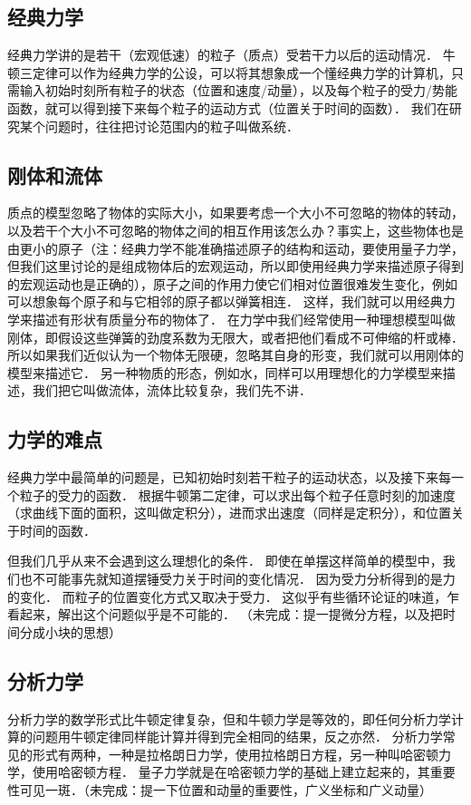 
\subsection{经典力学}
经典力学讲的是若干（宏观低速）的粒子（质点）受若干力以后的运动情况． 牛顿三定律可以作为经典力学的公设，可以将其想象成一个懂经典力学的计算机，只需输入初始时刻所有粒子的状态（位置和速度/动量），以及每个粒子的受力/势能函数，就可以得到接下来每个粒子的运动方式（位置关于时间的函数）． 我们在研究某个问题时，往往把讨论范围内的粒子叫做系统．

\subsection{刚体和流体}
质点的模型忽略了物体的实际大小，如果要考虑一个大小不可忽略的物体的转动，以及若干个大小不可忽略的物体之间的相互作用该怎么办？事实上，这些物体也是由更小的原子（注：经典力学不能准确描述原子的结构和运动，要使用量子力学，但我们这里讨论的是组成物体后的宏观运动，所以即使用经典力学来描述原子得到的宏观运动也是正确的），原子之间的作用力使它们相对位置很难发生变化，例如可以想象每个原子和与它相邻的原子都以弹簧相连． 这样，我们就可以用经典力学来描述有形状有质量分布的物体了． 在力学中我们经常使用一种理想模型叫做刚体，即假设这些弹簧的劲度系数为无限大，或者把他们看成不可伸缩的杆或棒． 所以如果我们近似认为一个物体无限硬，忽略其自身的形变，我们就可以用刚体的模型来描述它． 另一种物质的形态，例如水，同样可以用理想化的力学模型来描述，我们把它叫做流体，流体比较复杂，我们先不讲．

\subsection{力学的难点}
经典力学中最简单的问题是，已知初始时刻若干粒子的运动状态，以及接下来每一个粒子的受力的函数． 根据牛顿第二定律，可以求出每个粒子任意时刻的加速度（求曲线下面的面积，这叫做定积分），进而求出速度（同样是定积分），和位置关于时间的函数．

但我们几乎从来不会遇到这么理想化的条件． 即使在单摆这样简单的模型中，我们也不可能事先就知道摆锤受力关于时间的变化情况． 因为受力分析得到的是力的变化． 而粒子的位置变化方式又取决于受力． 这似乎有些循环论证的味道，乍看起来，解出这个问题似乎是不可能的．
（未完成：提一提微分方程，以及把时间分成小块的思想）

\subsection{分析力学}
分析力学的数学形式比牛顿定律复杂，但和牛顿力学是等效的，即任何分析力学计算的问题用牛顿定律同样能计算并得到完全相同的结果，反之亦然． 分析力学常见的形式有两种，一种是拉格朗日力学，使用拉格朗日方程，另一种叫哈密顿力学，使用哈密顿方程． 量子力学就是在哈密顿力学的基础上建立起来的，其重要性可见一斑．（未完成：提一下位置和动量的重要性，广义坐标和广义动量）

